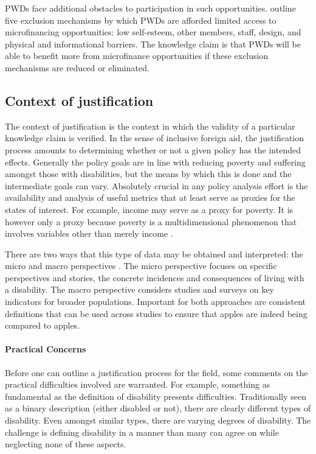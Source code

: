 \documentclass[a4paper]{article}
\begin{document}
PWDs face additional obstacles to participation in such opportunities.
\cite{mersland2008access} outline five exclusion mechanisms by which PWDs are
afforded limited access to microfinancing opportunities: low self-esteem,
other members, staff, design, and physical and informational barriers. The
knowledge claim is that PWDs will be able to benefit more from microfinance
opportunities if these exclusion mechanisms are reduced or eliminated.

\subsection{Context of justification}

The context of justification is the context in which the validity of a
particular knowledge claim is verified. In the sense of inclusive foreign aid,
the justification process amounts to determining whether or not a given policy
has the intended effects. Generally the policy goals are in line with reducing
poverty and suffering amongst those with disabilities, but the means by which
this is done and the intermediate goals can vary. Absolutely crucial in any
policy analysis effort is the availability and analysis of useful metrics that
at least serve as proxies for the states of interest. For example, income may
serve as a proxy for poverty. It is however only a proxy because poverty is a
multidimensional phenomenon that involves variables other than merely income
\citep{alkire2011understandings}.

There are two ways that this type of data may be obtained and interpreted: the
micro and macro perspectives \citep{ingstad2011disability}. The micro
perspective focuses on specific perspectives and stories, the concrete
incidences and consequences of living with a disability. The macro perspective
considers studies and surveys on key indicators for broader populations.
Important for both approaches are consistent definitions that can be used
across studies to ensure that apples are indeed being compared to apples.

\paragraph{Practical Concerns}

Before one can outline a justification process for the field, some comments on
the practical difficulties involved are warranted. For example, something as
fundamental as the definition of disability presents difficulties.
Traditionally seen as a binary description (either disabled or not), there are
clearly different types of disability. Even amongst similar types, there are
varying degrees of disability. The challenge is defining disability in a
manner than many can agree on while neglecting none of these aspects.
\end{document}
